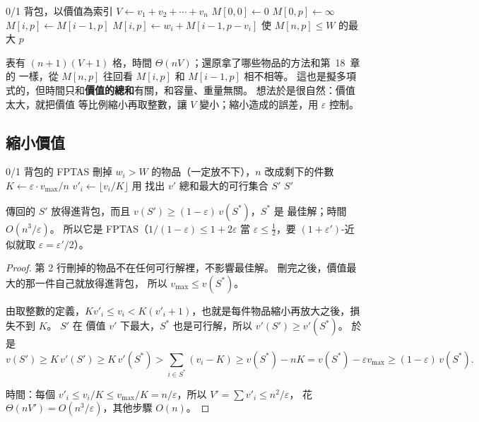 \begin{pseudo}[label=alg:apx-knap-value]{0/1 背包，以價值為索引}
    \State $V \gets v_1 + v_2 + \cdots + v_n$
    \State $M[0, 0] \gets 0$
        \State $M[0, p] \gets \infty$
    \EndFor
            \State $M[i, p] \gets M[i-1, p]$
                \State $M[i, p] \gets w_i + M[i-1, p - v_i]$
            \EndIf
        \EndFor
    \EndFor
    \State \Return 使 $M[n, p] \le W$ 的最大 $p$
\EndFunction
\end{pseudo}

表有 $(n + 1)(V + 1)$ 格，時間 $\Theta(nV)$；還原拿了哪些物品的方法和第~18~章的
 一樣，從 $M[n, p]$ 往回看 $M[i, p]$ 和 $M[i-1, p]$ 相不相等。 這也是擬多項
式的，但時間只和\textbf{價值的總和}有關，和容量、重量無關。 想法於是很自然：價值太大，就把價值
等比例縮小再取整數，讓 $V$ 變小；縮小造成的誤差，用 $\varepsilon$ 控制。

\subsection{縮小價值}

\begin{pseudo}[label=alg:apx-fptas]{0/1 背包的 FPTAS}
    \State 刪掉 $w_i > W$ 的物品（一定放不下），$n$ 改成剩下的件數
    \State $K \gets \varepsilon \cdot v_{\max} / n$ 
        \State $v'_i \gets \lfloor v_i / K \rfloor$
    \EndFor
    \State 用  找出 $v'$ 總和最大的可行集合 $S'$
    \State \Return $S'$
\EndFunction
\end{pseudo}

\begin{theorem}
\label{thm:apx-fptas}
 傳回的 $S'$ 放得進背包，而且 $v(S') \ge (1 - \varepsilon)\, v(S^*)$，$S^*$ 是
最佳解；時間 $O(n^3 / \varepsilon)$。 所以它是 FPTAS（$1/(1-\varepsilon) \le 1 + 2\varepsilon$
當 $\varepsilon \le \frac12$，要 $(1 + \varepsilon')$-近似就取 $\varepsilon = \varepsilon'/2$）。
\end{theorem}

\begin{proof}
第 2 行刪掉的物品不在任何可行解裡，不影響最佳解。 刪完之後，價值最大的那一件自己就放得進背包，
所以 $v_{\max} \le v(S^*)$。

由取整數的定義，$K v'_i \le v_i < K(v'_i + 1)$，也就是每件物品縮小再放大之後，損失不到 $K$。 $S'$ 在
價值 $v'$ 下最大，$S^*$ 也是可行解，所以 $v'(S') \ge v'(S^*)$。 於是
\[
v(S') \ge K\, v'(S') \ge K\, v'(S^*) > \sum_{i \in S^*} (v_i - K) \ge v(S^*) - nK
= v(S^*) - \varepsilon v_{\max} \ge (1 - \varepsilon)\, v(S^*).
\]

時間：每個 $v'_i \le v_i / K \le v_{\max}/K = n/\varepsilon$，所以 $V' = \sum v'_i \le n^2/\varepsilon$，
 花 $\Theta(nV') = O(n^3/\varepsilon)$，其他步驟 $O(n)$。
\end{proof}

